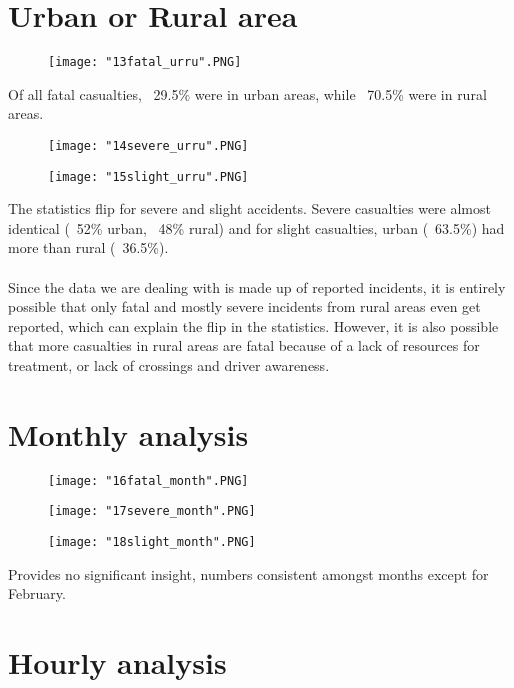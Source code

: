 \documentclass[a4paper, 12pt]{article}
\begin{document}
\section{Urban or Rural area}
\begin{figure}[!h]
\texttt{[image: "13fatal\_urru".PNG]}
\end{figure}
Of all fatal casualties, ~29.5\% were in urban areas, while ~70.5\% were in rural areas.
\begin{figure}[!h]
\texttt{[image: "14severe\_urru".PNG]}
\end{figure}
\begin{figure}[!h]
\texttt{[image: "15slight\_urru".PNG]}
\end{figure}
The statistics flip for severe and slight accidents. Severe casualties were almost identical (~52\% urban, ~48\% rural) and for slight casualties, urban (~63.5\%) had more than rural (~36.5\%).
\paragraph{} Since the data we are dealing with is made up of reported incidents, it is entirely possible that only fatal and mostly severe incidents from rural areas even get reported, which can explain the flip in the statistics. However, it is also possible that more casualties in rural areas are fatal because of a lack of resources for treatment, or lack of crossings and driver awareness.
\section{Monthly analysis}
\begin{figure}[!h]
\texttt{[image: "16fatal\_month".PNG]}
\end{figure}
\begin{figure}[!h]
\texttt{[image: "17severe\_month".PNG]}
\end{figure}
\begin{figure}[!h]
\texttt{[image: "18slight\_month".PNG]}
\end{figure}
Provides no significant insight, numbers consistent amongst months except for February.
\vfill
\clearpage
\section{Hourly analysis}
\end{document}
